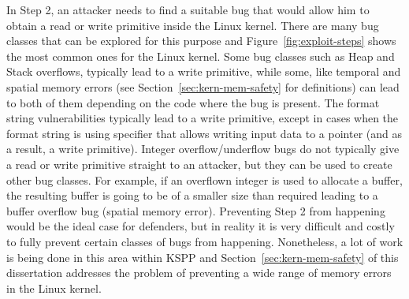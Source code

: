 In Step 2, an attacker needs to find a suitable bug that would allow him to obtain a read or write primitive inside the Linux kernel. There are many bug classes that can be explored for this purpose and Figure~\ref{fig:exploit-steps} shows the most common ones for the Linux kernel. Some bug classes such as Heap and Stack overflows, typically lead to a write primitive, while some, like temporal and spatial memory errors (see Section~\ref{sec:kern-mem-safety} for definitions) can lead to both of them depending on the code where the bug is present. The format string vulnerabilities typically lead to a write primitive, except in cases when the format string is using  specifier that allows writing input data to a pointer (and as a result, a write primitive). Integer overflow/underflow bugs do not typically give a read or write primitive straight to an attacker, but they can be used to create other bug classes. For example, if an overflown integer is used to allocate a buffer, the resulting buffer is going to be of a smaller size than required leading to a buffer overflow bug (spatial memory error). Preventing Step 2 from happening would be the ideal case for defenders, but in reality it is very difficult and costly to fully prevent certain classes of bugs from happening. Nonetheless, a lot of work is being done in this area within KSPP and Section~\ref{sec:kern-mem-safety} of this dissertation addresses the problem of preventing a wide range of memory errors in the Linux kernel. 

